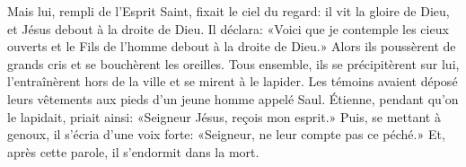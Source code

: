 Mais lui, rempli de l’Esprit Saint, fixait le ciel du regard:
	il vit la gloire de Dieu, et Jésus debout à la droite de Dieu.
Il déclara: «Voici que je contemple les cieux ouverts
	et le Fils de l’homme debout à la droite de Dieu.»
Alors ils poussèrent de grands cris et se bouchèrent les oreilles.
Tous ensemble, ils se précipitèrent sur lui,
	l’entraînèrent hors de la ville et se mirent à le lapider.
Les témoins avaient déposé leurs vêtements
		aux pieds d’un jeune homme appelé Saul.
Étienne, pendant qu’on le lapidait, priait ainsi:
	«Seigneur Jésus, reçois mon esprit.»
Puis, se mettant à genoux, il s’écria d’une voix forte:
	«Seigneur, ne leur compte pas ce péché.»
Et, après cette parole, il s’endormit dans la mort.
